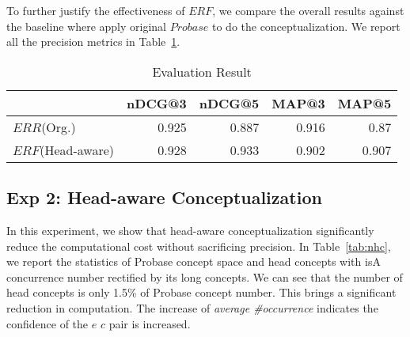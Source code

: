


To further justify the effectiveness of $ERF$, we compare the overall results against the baseline where apply original $Probase$ to do the conceptualization.
We report all the precision metrics in Table~\ref{tab:ndcg}. 

\begin{table}[!htbp]
\vspace{-4mm}
\small	
  \centering
  \caption{Evaluation Result}
	\begin{tabular}{lrrrr}
	\toprule
	     & nDCG@3 & nDCG@5 & MAP@3 & MAP@5 \\
	\midrule
	$ERR$(Org.) & 0.925 & 0.887 & 0.916 & 0.87 \\
	$ERF$(Head-aware) & 0.928 & 0.933 & 0.902 & 0.907 \\
	\bottomrule
	\end{tabular}%

  \label{tab:ndcg}%
\end{table}%





\subsection{Exp 2: Head-aware Conceptualization}
In this experiment, we show that head-aware conceptualization significantly reduce the computational cost without sacrificing precision. 
In Table~\ref{tab:nhc}, we report the statistics of Probase concept space and head concepts with isA concurrence number rectified by its long concepts. 
We can see that the number of head concepts is only 1.5\% of Probase concept number. This brings a significant reduction in computation. 
The increase of \emph{average \#occurrence} indicates the confidence of the $e$ \isa $c$ pair is increased.


